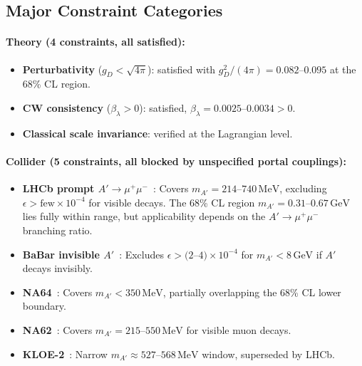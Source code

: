 \documentclass[a4paper,11pt]{article}
\newcommand{\GeV}{\,\text{GeV}}
\newcommand{\MeV}{\,\text{MeV}}
\begin{document}
\subsection{Major Constraint Categories}

\paragraph{Theory (4 constraints, all satisfied):}
\begin{itemize}
\item \textbf{Perturbativity} ($g_D < \sqrt{4\pi}$): satisfied with $g_D^2/(4\pi) = 0.082$--$0.095$ at the 68\% CL region.
\item \textbf{CW consistency} ($\beta_\lambda > 0$): satisfied, $\beta_\lambda = 0.0025$--$0.0034 > 0$.
\item \textbf{Classical scale invariance}: verified at the Lagrangian level.
\end{itemize}

\paragraph{Collider (5 constraints, all blocked by unspecified portal couplings):}
\begin{itemize}
\item \textbf{LHCb prompt $A' \to \mu^+\mu^-$}~\cite{lhcb2019}: Covers $m_{A'} = 214$--$740\MeV$, excluding $\epsilon > \text{few}\times10^{-4}$ for visible decays. The 68\% CL region $m_{A'} = 0.31$--$0.67\GeV$ lies fully within range, but applicability depends on the $A'\to\mu^+\mu^-$ branching ratio.
\item \textbf{BaBar invisible $A'$}~\cite{babar2017}: Excludes $\epsilon > (2$--$4)\times10^{-4}$ for $m_{A'} < 8\GeV$ if $A'$ decays invisibly.
\item \textbf{NA64}~\cite{na64darkmatter}: Covers $m_{A'} < 350\MeV$, partially overlapping the 68\% CL lower boundary.
\item \textbf{NA62}~{}: Covers $m_{A'} = 215$--$550\MeV$ for visible muon decays.
\item \textbf{KLOE-2}~{}: Narrow $m_{A'} \approx 527$--$568\MeV$ window, superseded by LHCb.
\end{itemize}
\end{document}
